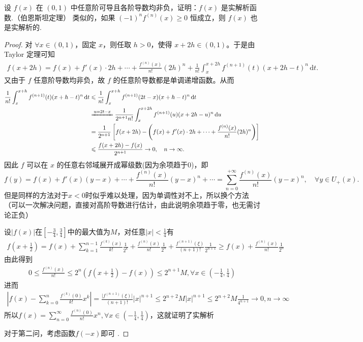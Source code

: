 \documentclass[../../main.tex]{subfiles}%
\begin{document}
\begin{example}
设 \( f(x) \) 在 \( (0,1) \) 中任意阶可导且各阶导数均非负，证明：\( f(x) \) 是实解析函数.（伯恩斯坦定理） 
类似的，如果 \( (-1)^n f^{(n)}(x) \geqslant  0 \) 恒成立，则 \( f(x) \) 也是实解析的. 
\end{example}
\begin{proof}

对 \(\forall x \in (0,1)\)，固定 \(x\)，则任取 \(h>0\)，使得 \(x+2h \in (0,1)\)。于是由 Taylor 定理可知
\begin{align*}
f(x+2h) = f(x) + f'(x) \cdot 2h + \cdots + \frac{f^{(n)}(x)}{n!} (2h)^n + \frac{1}{n!} \int_x^{x+2h} f^{(n+1)}(t) (x+2h-t)^n \, \mathrm{d}t.
\end{align*}
又由于 \(f\) 任意阶导数均非负，故 \(f\) 的任意阶导数都是单调递增函数。从而
\begin{align*}
\frac{1}{n!} \int_x^{x+h} f^{(n+1)}(t) (x+h-t)^n \, \mathrm{d}t &\leqslant \frac{1}{n!} \int_x^{x+h} f^{(n+1)}(2t-x) (x+h-t)^n \, \mathrm{d}t \\
&\xlongequal{u=2t-x} \frac{1}{2^{n+1} n!} \int_x^{x+2h} f^{(n+1)}(u) (x+2h-u)^n \, \mathrm{d}u \\
&= \frac{1}{2^{n+1}} \left[ f(x+2h) - \left( f(x) + f'(x) \cdot 2h + \cdots + \frac{f^{(n)}(x)}{n!} (2h)^n \right) \right] \\
&\leqslant \frac{f(x+2h) - f(x)}{2^{n+1}} \to 0, \quad n \to \infty.
\end{align*}
因此 \(f\) 可以在 \(x\) 的任意右邻域展开成幂级数(因为余项趋于0)，即
\[
f(y) = f(x) + f'(x) (y-x) + \cdots + \frac{f^{(n)}(x)}{n!} (y-x)^n + \cdots = \sum_{n=0}^{+\infty} \frac{f^{(n)}(x)}{n!} (y-x)^n, \quad \forall y \in U_+(x).
\]
但是同样的方法对于\(x < 0\)时似乎难以处理，因为单调性对不上，所以换个方法（可以一次解决问题，直接对高阶导数进行估计，由此说明余项趋于零，也无需讨论正负）

设\(\vert f(x)\vert\)在\([-\frac{3}{4},\frac{3}{4}]\)中的最大值为\(M\)，对任意\(\vert x\vert<\frac{1}{4}\)有
\begin{align*}
f\left(x + \frac{1}{2}\right)=f(x)+\sum_{k = 1}^{n - 1}\frac{f^{(k)}(x)}{k!}\frac{1}{2^{k}}+\frac{f^{(n)}(x)}{n!}\frac{1}{2^{n}}+\frac{f^{(n + 1)}(\xi)}{(n + 1)!}\frac{1}{2^{n + 1}}\geqslant  f(x)+\frac{f^{(n)}(x)}{n!}\frac{1}{2^{n}}
\end{align*}
由此得到
\begin{align*}
0\leqslant \frac{f^{(n)}(x)}{n!}\leqslant  2^{n}\left(f\left(x+\frac{1}{2}\right)-f(x)\right)\leqslant  2^{n + 1}M,\forall x\in\left(-\frac{1}{4},\frac{1}{4}\right)
\end{align*}
进而
\begin{align*}
\left\vert f(x)-\sum_{k = 0}^{n}\frac{f^{(k)}(0)}{k!}x^{k}\right\vert=\frac{\vert f^{(n + 1)}(\xi)\vert}{(n + 1)!}\vert x\vert^{n + 1}\leqslant  2^{n + 2}M\vert x\vert^{n + 1}\leqslant  2^{n + 2}M\frac{1}{4^{n + 1}}\to 0,n\to\infty
\end{align*}
所以\(f(x)=\sum_{n = 0}^{\infty}\frac{f^{(n)}(0)}{n!}x^{n},\forall x\in\left(-\frac{1}{4},\frac{1}{4}\right)\)，这就证明了实解析

对于第二问，考虑函数\(f(-x)\)即可 .

\end{proof}
\end{document}
